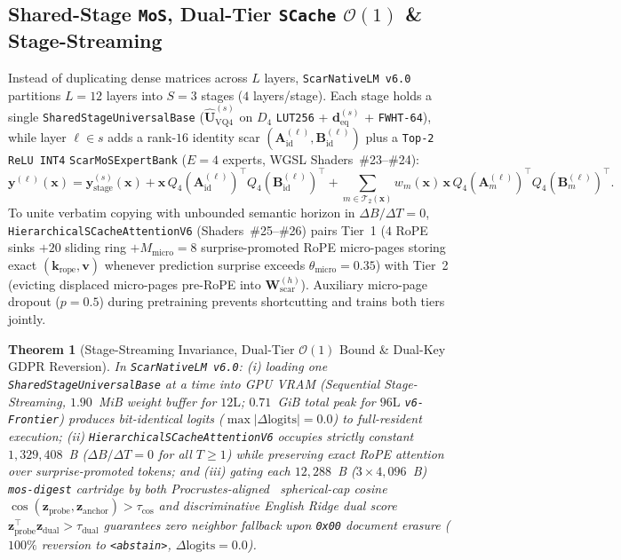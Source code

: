 \documentclass[10pt,twocolumn]{article}
\newtheorem{theorem}{Theorem}
\begin{document}
\subsection{Shared-Stage \texttt{MoS}, Dual-Tier \texttt{SCache} $\mathcal{O}(1)$ \& Stage-Streaming}
Instead of duplicating dense matrices across $L$ layers, \texttt{ScarNativeLM v6.0} partitions $L=12$ layers into $S=3$ stages ($4$ layers/stage). Each stage holds a single \texttt{SharedStageUniversalBase} ($\widehat{\mathbf{U}}_{\text{VQ4}}^{(s)}$ on $D_4$ \texttt{LUT256} + $\mathbf{d}_{\text{eq}}^{(s)}$ + \texttt{FWHT-64}), while layer $\ell \in s$ adds a rank-$16$ identity scar $(\mathbf{A}_{\text{id}}^{(\ell)}, \mathbf{B}_{\text{id}}^{(\ell)})$ plus a \texttt{Top-2 ReLU INT4} \texttt{ScarMoSExpertBank} ($E=4$ experts, WGSL Shaders~\#23--\#24):
\begin{equation}
    \mathbf{y}^{(\ell)}(\mathbf{x}) = \mathbf{y}_{\text{stage}}^{(s)}(\mathbf{x}) + \mathbf{x}\,Q_4(\mathbf{A}_{\text{id}}^{(\ell)})^\top Q_4(\mathbf{B}_{\text{id}}^{(\ell)})^\top + \sum_{m \in \mathcal{T}_2(\mathbf{x})} w_m(\mathbf{x})\,\mathbf{x}\,Q_4(\mathbf{A}_m^{(\ell)})^\top Q_4(\mathbf{B}_m^{(\ell)})^\top.
    \label{eq:shared_stage_mos}
\end{equation}
To unite verbatim copying with unbounded semantic horizon in $\Delta B/\Delta T = 0$, \texttt{HierarchicalSCacheAttentionV6} (Shaders~\#25--\#26) pairs Tier~1 ($4$ RoPE sinks $+ 20$ sliding ring $+ M_{\text{micro}}=8$ surprise-promoted RoPE micro-pages storing exact $(\mathbf{k}_{\text{rope}}, \mathbf{v})$ whenever prediction surprise exceeds $\theta_{\text{micro}}=0.35$) with Tier~2 (evicting displaced micro-pages pre-RoPE into $\mathbf{W}_{\text{scar}}^{(h)}$). Auxiliary micro-page dropout ($p=0.5$) during pretraining prevents shortcutting and trains both tiers jointly.

\begin{theorem}[Stage-Streaming Invariance, Dual-Tier $\mathcal{O}(1)$ Bound \& Dual-Key GDPR Reversion]
\label{thm:v6}
In \texttt{ScarNativeLM v6.0}: (i) loading one \texttt{SharedStageUniversalBase} at a time into GPU VRAM (\emph{Sequential Stage-Streaming}, $1.90$~MiB weight buffer for $12\text{L}$; $0.71$~GiB total peak for $96\text{L}$ \texttt{v6-Frontier}) produces bit-identical logits ($\max|\Delta\text{logits}| = 0.0$) to full-resident execution; (ii) \texttt{HierarchicalSCacheAttentionV6} occupies strictly constant $1{,}329{,}408$~B ($\Delta B / \Delta T = 0$ for all $T \ge 1$) while preserving exact RoPE attention over surprise-promoted tokens; and (iii) gating each $12{,}288$~B ($3\times 4{,}096$~B) \texttt{mos-digest} cartridge by both Procrustes-aligned~\citep{schonemann1966generalized} spherical-cap cosine $\cos(\mathbf{z}_{\text{probe}}, \mathbf{z}_{\text{anchor}}) > \tau_{\text{cos}}$ and discriminative English Ridge dual score $\mathbf{z}_{\text{probe}}^\top \mathbf{z}_{\text{dual}} > \tau_{\text{dual}}$ guarantees zero neighbor fallback upon \texttt{0x00} document erasure ($100\%$ reversion to \texttt{<abstain>}, $\Delta\text{logits}=0.0$).
\end{theorem}
\end{document}

